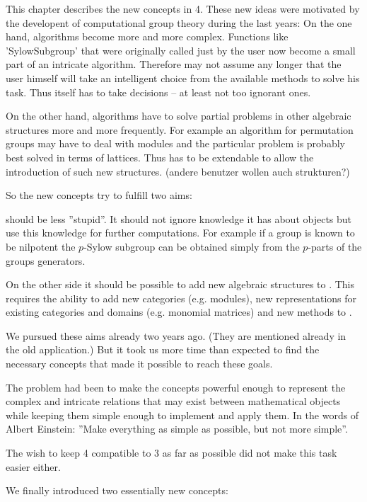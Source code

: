 
This chapter describes the new concepts in {\GAP}4.
These new ideas were
motivated by the developent of computational group theory during the last
years:
On the one hand, algorithms become more and more complex. Functions like
'SylowSubgroup' that were originally called just by the user now become
a small part of an intricate algorithm. Therefore {\GAP} may not assume any
longer that the user himself will take an intelligent choice from the
available methods to solve his task. Thus {\GAP} itself has to take decisions
-- at least not too ignorant ones.

On the other hand, algorithms have to solve partial problems in other
algebraic structures more and more frequently. For example an algorithm for
permutation groups may have to deal with modules and the particular problem
is probably best solved in terms of lattices. Thus {\GAP} has to be extendable
to allow the introduction of such new structures.
(andere benutzer wollen auch strukturen?)

So the new concepts try to fulfill two aims:

{\GAP} should be less ''stupid''. It should not ignore knowledge it has about
objects but use this knowledge for further computations. For example if a
group is known to be nilpotent the $p$-Sylow subgroup can be obtained simply
from the $p$-parts of the groups generators.

On the other side it should be possible to add new algebraic structures to
{\GAP}. This requires the ability to add new categories (e.g. modules), new
representations for existing categories and domains (e.g. monomial matrices)
and new methods to {\GAP}.

We pursued these aims already two years ago. (They are mentioned already in
the old application.) But it took us more time than expected to find the
necessary concepts that made it possible to reach these goals.

The problem had been to make the concepts powerful enough to represent the
complex and intricate relations that may exist between mathematical objects
while keeping them simple enough to implement and apply them. In the words
of Albert Einstein: ''Make everything as simple as possible, but not more
simple''.

The wish to keep {\GAP} 4 compatible to {\GAP} 3 as far as possible did not make
this task easier either.

We finally introduced two essentially new concepts:

